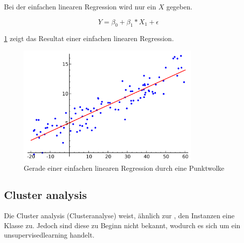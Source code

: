 Bei der einfachen linearen Regression wird nur ein $X$ gegeben.

\begin{equation} \label{eq:recherche:dataminingtechniken:disziplinen:regression:2}
Y = \beta_0 + \beta_1 * X_1 + \epsilon
\end{equation}

\cref{fig:recherche:dataminingtechniken:disziplinen:regression} zeigt das Resultat einer einfachen linearen Regression.

\begin{figure}[H]
	\RawFloats
	\centering
	\includegraphics[width=0.8\textwidth]{images/Linear_regression.png}
	\caption{Gerade einer einfachen linearen Regression durch eine Punktwolke}
	\label{fig:recherche:dataminingtechniken:disziplinen:regression}
\end{figure}

\subsection{Cluster analysis}
\label{sec:recherche:dataminingtechniken:disziplinen:clusteranalysis}
Die Cluster analysis (Clusteranalyse) weist, ähnlich zur , den Instanzen eine Klasse zu. Jedoch sind diese zu Beginn nicht bekannt, wodurch es sich um ein \gls{unsupervisedlearning} handelt.

